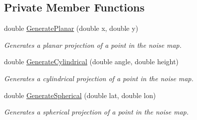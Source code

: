 \subsection*{Private Member Functions}
\begin{DoxyCompactItemize}
\item 
double \hyperlink{class_lib_noise_1_1_noise2_d_ab53ca090293be5c2d927c5118c67bbaa}{Generate\+Planar} (double x, double y)
\begin{DoxyCompactList}\small\item\em Generates a planar projection of a point in the noise map. \end{DoxyCompactList}\item 
double \hyperlink{class_lib_noise_1_1_noise2_d_a7507549314e864809cf5deb036decd7f}{Generate\+Cylindrical} (double angle, double height)
\begin{DoxyCompactList}\small\item\em Generates a cylindrical projection of a point in the noise map. \end{DoxyCompactList}\item 
double \hyperlink{class_lib_noise_1_1_noise2_d_acb1b8ad121e0cce7ee070ce6d6b015da}{Generate\+Spherical} (double lat, double lon)
\begin{DoxyCompactList}\small\item\em Generates a spherical projection of a point in the noise map. \end{DoxyCompactList}\end{DoxyCompactItemize}
